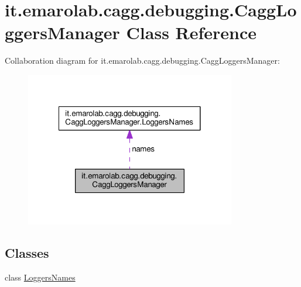 \hypertarget{classit_1_1emarolab_1_1cagg_1_1debugging_1_1CaggLoggersManager}{\section{it.\-emarolab.\-cagg.\-debugging.\-Cagg\-Loggers\-Manager Class Reference}
\label{classit_1_1emarolab_1_1cagg_1_1debugging_1_1CaggLoggersManager}
}


Collaboration diagram for it.\-emarolab.\-cagg.\-debugging.\-Cagg\-Loggers\-Manager\-:\nopagebreak
\begin{figure}[H]
\begin{center}
\leavevmode
\includegraphics[width=260pt]{classit_1_1emarolab_1_1cagg_1_1debugging_1_1CaggLoggersManager__coll__graph}
\end{center}
\end{figure}
\subsection*{Classes}
\begin{DoxyCompactItemize}
\item 
class \hyperlink{classit_1_1emarolab_1_1cagg_1_1debugging_1_1CaggLoggersManager_1_1LoggersNames}{Loggers\-Names}
\end{DoxyCompactItemize}
